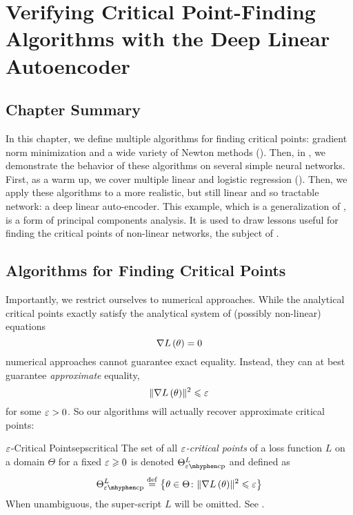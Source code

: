 \documentclass[../../thesis.tex]{subfiles}
\begin{document}
\chapter{Verifying
Critical Point-Finding Algorithms
with the Deep Linear Autoencoder}
\onlyinsubfile{\begin{KeepFromToc}
		\tableofcontents
		\clearpage
		\listoffigures
		\listoftables
	\end{KeepFromToc}}
\onlyinsubfile{\clearpage}
\onlyinsubfile{\linenumbers}

\section{Chapter Summary}

In this chapter,
we define multiple algorithms for finding critical points:
gradient norm minimization
and a wide variety of Newton methods
().
Then, in ,
we demonstrate the behavior of these algorithms
on several simple neural networks.
First, as a warm up,
we cover multiple linear and logistic regression
().
Then, we apply these algorithms to a more realistic,
but still linear and so tractable network:
a deep linear auto-encoder.
This example, which is
a generalization of ,
is a form of principal components analysis.
It is used to draw lessons useful
for finding the critical points of non-linear networks,
the subject of .

\section{Algorithms for Finding Critical Points}

Importantly, we restrict ourselves to numerical approaches.
While the analytical critical points exactly satisfy
the analytical system of (possibly non-linear) equations
\begin{equation}
	\nabla L\left(\theta\right) = 0
\end{equation}
\noindent numerical approaches cannot guarantee
exact equality.
Instead, they can at best guarantee \emph{approximate} equality,
\begin{equation}
	\lVert\nabla L\left(\theta\right)\rVert^2 \leqslant \varepsilon
\end{equation}
\noindent for some $\varepsilon > 0$.
So our algorithms will actually recover approximate critical points:

\begin{definition}{$\varepsilon$-Critical Points}{epscritical}
	The set of all \emph{$\varepsilon$-critical points} of a loss function $L$
	on a domain $\Theta$ for a fixed $\varepsilon\geqslant0$ is denoted $\Theta^L_{\ecp}$
	and defined as
	\begin{equation}\equationlabel{def-epscp}
		\Theta^L_{\ecp} \defeq
		\Set{\theta \in \Theta \suchthat \sgn{L}{\theta} \leq \eps}
	\end{equation}
	When unambiguous, the super-script $L$ will be omitted.
	See .
\end{definition}
\end{document}
